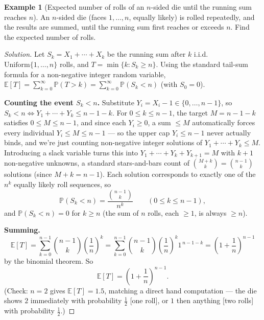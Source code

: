 \documentclass[11pt]{article}
\theoremstyle{definition}
\newtheorem{example}{Example}[section]
\newcommand{\E}{\mathbb{E}}
\begin{document}
\begin{example}[Expected number of rolls of an $n$-sided die until the running sum reaches $n$]
An $n$-sided die (faces $1,\dots,n$, equally likely) is rolled repeatedly, and the results are summed, until the running sum first reaches or exceeds $n$. Find the expected number of rolls.
\end{example}
\begin{proof}[Solution]
Let $S_k=X_1+\cdots+X_k$ be the running sum after $k$ i.i.d.\ $\mathrm{Uniform}\{1,\dots,n\}$ rolls, and $T=\min\{k:S_k\ge n\}$. Using the standard tail-sum formula for a non-negative integer random variable, $\E[T]=\sum_{k=0}^{\infty}\mathbb P(T>k)=\sum_{k=0}^{\infty}\mathbb P(S_k<n)$ (with $S_0=0$).

\textbf{Counting the event $S_k<n$.} Substitute $Y_i=X_i-1\in\{0,\dots,n-1\}$, so $S_k<n\iff Y_1+\cdots+Y_k\le n-1-k$. For $0\le k\le n-1$, the target $M=n-1-k$ satisfies $0\le M\le n-1$, and since each $Y_i\ge0$, a sum $\le M$ automatically forces every individual $Y_i\le M\le n-1$ — so the upper cap $Y_i\le n-1$ never actually binds, and we're just counting non-negative integer solutions of $Y_1+\cdots+Y_k\le M$. Introducing a slack variable turns this into $Y_1+\cdots+Y_k+Y_{k+1}=M$ with $k+1$ non-negative unknowns, a standard stars-and-bars count of $\binom{M+k}{k}=\binom{n-1}{k}$ solutions (since $M+k=n-1$). Each solution corresponds to exactly one of the $n^k$ equally likely roll sequences, so
\[
\mathbb P(S_k<n)=\frac{\binom{n-1}{k}}{n^k}\qquad(0\le k\le n-1),
\]
and $\mathbb P(S_k<n)=0$ for $k\ge n$ (the sum of $n$ rolls, each $\ge1$, is always $\ge n$).

\textbf{Summing.}
\[
\E[T]=\sum_{k=0}^{n-1}\binom{n-1}{k}\left(\frac1n\right)^k=\sum_{k=0}^{n-1}\binom{n-1}{k}\left(\frac1n\right)^k1^{\,n-1-k}=\left(1+\frac1n\right)^{n-1}
\]
by the binomial theorem. So
\[
\boxed{\E[T]=\left(1+\frac1n\right)^{n-1}}.
\]
(Check: $n=2$ gives $\E[T]=1.5$, matching a direct hand computation — the die shows $2$ immediately with probability $\tfrac12$ [one roll], or $1$ then anything [two rolls] with probability $\tfrac12$.)
\end{proof}
\end{document}
